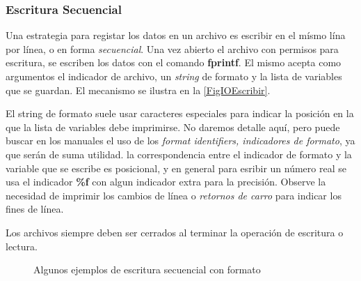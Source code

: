 \subsubsection{Escritura Secuencial}


Una estrategia para registar los datos en un archivo es 
escribir en el mísmo lína por línea, o en forma \emph{secuencial}.
Una vez abierto el archivo con permisos para escritura, 
se escriben los datos con el comando \textbf{fprintf}. 
El mismo acepta como argumentos el indicador de archivo, 
un \emph{string} de formato y la lista de variables 
que se guardan. El mecanismo se ilustra en la 
\autoref{FigIOEscribir}.

El string de formato suele usar caracteres especiales para indicar
la posición en la que la lista de variables debe 
imprimirse. No daremos detalle aquí, pero puede
buscar en los manuales el uso de los \emph{format 
identifiers, indicadores de formato}, ya que serán 
de suma utilidad. la correspondencia entre el 
indicador de formato y la variable que se escribe
es posicional, y en general para esribir un número 
real se usa el indicador \textbf{\%f} con algun 
indicador extra para la precisión. 
Observe la necesidad de imprimir los cambios de línea
o \emph{retornos de carro} para indicar los fines de línea. 

Los archivos siempre deben ser cerrados al terminar la operación 
de escritura o lectura. 

\begin{figure}
  \caption{Algunos ejemplos de escritura secuencial con formato\label{FigIOEscribir}}
\end{figure}
\mode*

